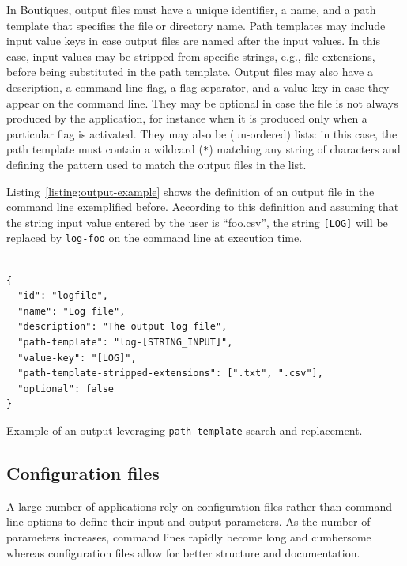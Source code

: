 \documentclass[a4paper,num-refs]{oup-contemporary}
\newcommand{\boutiques}{Boutiques\xspace}
\begin{document}
In \boutiques, output files must have a unique identifier, a name, and
a path template that specifies the file or directory name. Path
templates may include input value keys in case output files are named
after the input values. In this case, input values may be stripped
from specific strings, e.g., file extensions, before being substituted
in the path template. Output files may also have a description, a
command-line flag, a flag separator, and a value key in case they
appear on the command line. They may be optional in case the file is
not always produced by the application, for instance when it is
produced only when a particular flag is activated. They may also be
(un-ordered) lists: in this case, the path template must contain a
wildcard (\texttt{*}) matching any string of characters and defining
the pattern used to match the output files in the list.

Listing~\ref{listing:output-example} shows the definition of an output
file in the command line exemplified before. According to this
definition and assuming that the string input value entered by the
user is ``foo.csv'', the string \texttt{[LOG]} will be
replaced by \texttt{log-foo} on the command line at execution time.

\begin{listing}
\begin{verbatim}

{
  "id": "logfile",
  "name": "Log file",
  "description": "The output log file",
  "path-template": "log-[STRING_INPUT]",
  "value-key": "[LOG]",
  "path-template-stripped-extensions": [".txt", ".csv"],
  "optional": false
}
\end{verbatim}
\caption{Example of an output leveraging \texttt{path-template} search-and-replacement.} 
\label{listing:output-example}
\end{listing}

\subsection{Configuration files}
\label{sec:configuration-files}
A large number of applications rely on configuration files rather than
command-line options to define their input and output parameters. As
the number of parameters increases, command lines rapidly become long
and cumbersome whereas configuration files allow for better structure
and documentation.
\end{document}
